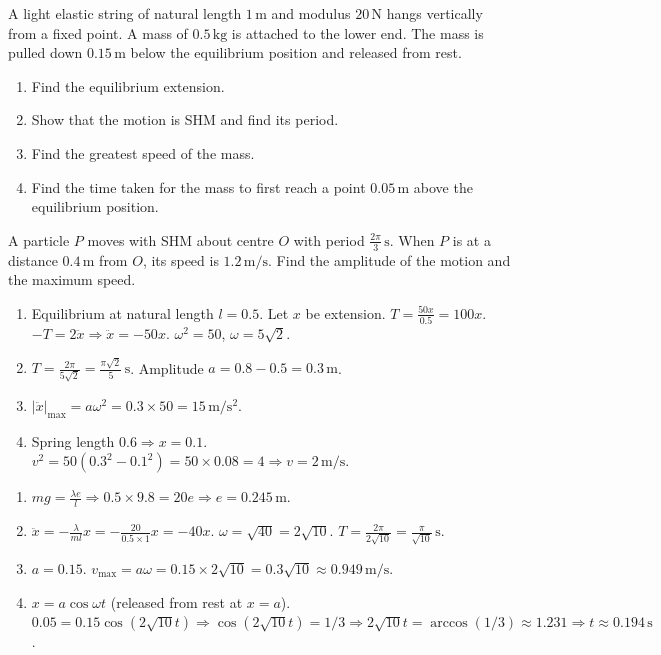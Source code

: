 \documentclass[11pt]{article}
\begin{document}
\begin{exercice}[Exercise 2]
A light elastic string of natural length $1\,\mathrm{m}$ and modulus $20\,\mathrm{N}$ hangs vertically from a fixed point. A mass of $0.5\,\mathrm{kg}$ is attached to the lower end. The mass is pulled down $0.15\,\mathrm{m}$ below the equilibrium position and released from rest.
\begin{enumerate}
    \item Find the equilibrium extension.
    \item Show that the motion is SHM and find its period.
    \item Find the greatest speed of the mass.
    \item Find the time taken for the mass to first reach a point $0.05\,\mathrm{m}$ above the equilibrium position.
\end{enumerate}
\end{exercice}

\begin{exercice}[Exercise 3]
A particle $P$ moves with SHM about centre $O$ with period $\frac{2\pi}{3}\,\mathrm{s}$. When $P$ is at a distance $0.4\,\mathrm{m}$ from $O$, its speed is $1.2\,\mathrm{m/s}$. Find the amplitude of the motion and the maximum speed.
\end{exercice}

\begin{corrige}[Exercise 1]
\begin{enumerate}
    \item Equilibrium at natural length $l=0.5$. Let $x$ be extension. $T = \frac{50x}{0.5}=100x$. $-T = 2\ddot{x} \Rightarrow \ddot{x} = -50x$. $\omega^2=50$, $\omega=5\sqrt{2}$.
    \item $T = \frac{2\pi}{5\sqrt{2}} = \frac{\pi\sqrt{2}}{5}\,\mathrm{s}$. Amplitude $a = 0.8-0.5 = 0.3\,\mathrm{m}$.
    \item $|\ddot{x}|_{\max} = a\omega^2 = 0.3 \times 50 = 15\,\mathrm{m/s^2}$.
    \item Spring length $0.6 \Rightarrow x=0.1$. $v^2 = 50(0.3^2-0.1^2) = 50 \times 0.08 = 4 \Rightarrow v = 2\,\mathrm{m/s}$.
\end{enumerate}
\end{corrige}

\begin{corrige}[Exercise 2]
\begin{enumerate}
    \item $mg = \frac{\lambda e}{l} \Rightarrow 0.5 \times 9.8 = 20e \Rightarrow e = 0.245\,\mathrm{m}$.
    \item $\ddot{x} = -\frac{\lambda}{ml}x = -\frac{20}{0.5 \times 1}x = -40x$. $\omega = \sqrt{40}=2\sqrt{10}$. $T = \frac{2\pi}{2\sqrt{10}} = \frac{\pi}{\sqrt{10}}\,\mathrm{s}$.
    \item $a = 0.15$. $v_{\max} = a\omega = 0.15 \times 2\sqrt{10} = 0.3\sqrt{10} \approx 0.949\,\mathrm{m/s}$.
    \item $x = a\cos\omega t$ (released from rest at $x=a$). $0.05 = 0.15\cos(2\sqrt{10}t) \Rightarrow \cos(2\sqrt{10}t) = 1/3 \Rightarrow 2\sqrt{10}t = \arccos(1/3) \approx 1.231 \Rightarrow t \approx 0.194\,\mathrm{s}$.
\end{enumerate}
\end{corrige}
\end{document}
